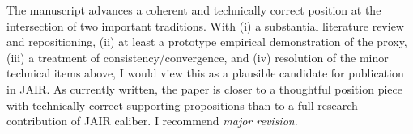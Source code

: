 \documentclass[11pt]{article}
\begin{document}
The manuscript advances a coherent and technically correct position at the intersection of two important traditions. With (i) a substantial literature review and repositioning, (ii) at least a prototype empirical demonstration of the proxy, (iii) a treatment of consistency/convergence, and (iv) resolution of the minor technical items above, I would view this as a plausible candidate for publication in JAIR. As currently written, the paper is closer to a thoughtful position piece with technically correct supporting propositions than to a full research contribution of JAIR caliber. I recommend \emph{major revision}.
\end{document}
